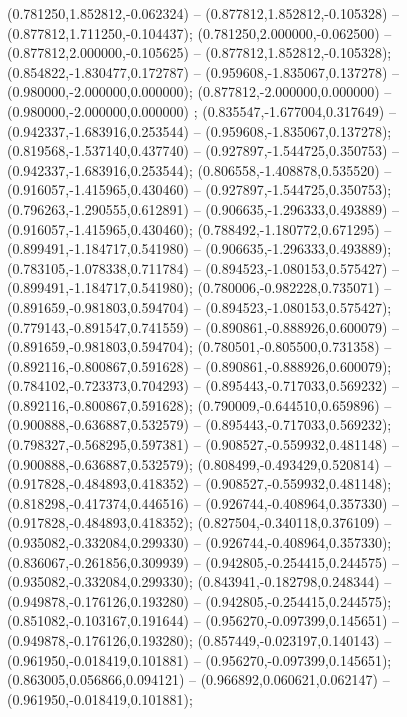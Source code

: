  (0.781250,1.852812,-0.062324) -- (0.877812,1.852812,-0.105328) -- (0.877812,1.711250,-0.104437);
 (0.781250,2.000000,-0.062500) -- (0.877812,2.000000,-0.105625) -- (0.877812,1.852812,-0.105328);
 (0.854822,-1.830477,0.172787) -- (0.959608,-1.835067,0.137278) -- (0.980000,-2.000000,0.000000);
 (0.877812,-2.000000,0.000000) -- (0.980000,-2.000000,0.000000) ;
 (0.835547,-1.677004,0.317649) -- (0.942337,-1.683916,0.253544) -- (0.959608,-1.835067,0.137278);
 (0.819568,-1.537140,0.437740) -- (0.927897,-1.544725,0.350753) -- (0.942337,-1.683916,0.253544);
 (0.806558,-1.408878,0.535520) -- (0.916057,-1.415965,0.430460) -- (0.927897,-1.544725,0.350753);
 (0.796263,-1.290555,0.612891) -- (0.906635,-1.296333,0.493889) -- (0.916057,-1.415965,0.430460);
 (0.788492,-1.180772,0.671295) -- (0.899491,-1.184717,0.541980) -- (0.906635,-1.296333,0.493889);
 (0.783105,-1.078338,0.711784) -- (0.894523,-1.080153,0.575427) -- (0.899491,-1.184717,0.541980);
 (0.780006,-0.982228,0.735071) -- (0.891659,-0.981803,0.594704) -- (0.894523,-1.080153,0.575427);
 (0.779143,-0.891547,0.741559) -- (0.890861,-0.888926,0.600079) -- (0.891659,-0.981803,0.594704);
 (0.780501,-0.805500,0.731358) -- (0.892116,-0.800867,0.591628) -- (0.890861,-0.888926,0.600079);
 (0.784102,-0.723373,0.704293) -- (0.895443,-0.717033,0.569232) -- (0.892116,-0.800867,0.591628);
 (0.790009,-0.644510,0.659896) -- (0.900888,-0.636887,0.532579) -- (0.895443,-0.717033,0.569232);
 (0.798327,-0.568295,0.597381) -- (0.908527,-0.559932,0.481148) -- (0.900888,-0.636887,0.532579);
 (0.808499,-0.493429,0.520814) -- (0.917828,-0.484893,0.418352) -- (0.908527,-0.559932,0.481148);
 (0.818298,-0.417374,0.446516) -- (0.926744,-0.408964,0.357330) -- (0.917828,-0.484893,0.418352);
 (0.827504,-0.340118,0.376109) -- (0.935082,-0.332084,0.299330) -- (0.926744,-0.408964,0.357330);
 (0.836067,-0.261856,0.309939) -- (0.942805,-0.254415,0.244575) -- (0.935082,-0.332084,0.299330);
 (0.843941,-0.182798,0.248344) -- (0.949878,-0.176126,0.193280) -- (0.942805,-0.254415,0.244575);
 (0.851082,-0.103167,0.191644) -- (0.956270,-0.097399,0.145651) -- (0.949878,-0.176126,0.193280);
 (0.857449,-0.023197,0.140143) -- (0.961950,-0.018419,0.101881) -- (0.956270,-0.097399,0.145651);
 (0.863005,0.056866,0.094121) -- (0.966892,0.060621,0.062147) -- (0.961950,-0.018419,0.101881);
